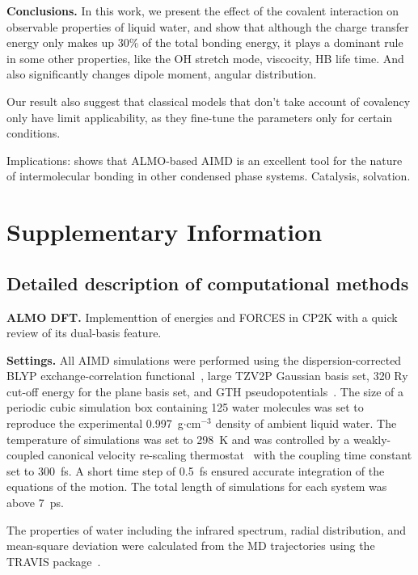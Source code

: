 \documentclass[prl,twocolumn,showpacs]{revtex4}
\begin{document}
\textbf{Conclusions.} In this work, we present the effect of the covalent interaction on observable properties of liquid water, and show that although the charge transfer energy only makes up 30\% of the total bonding energy, it plays a dominant rule in some other properties, like the OH stretch mode, viscocity, HB life time. And also significantly changes dipole moment, angular distribution. 
 
Our result also suggest that classical models that don't take account of covalency only have limit applicability, as they fine-tune the parameters only for certain conditions.
 
Implications: shows that ALMO-based AIMD is an excellent tool for the nature of intermolecular bonding in other condensed phase systems. Catalysis, solvation.

\section{Supplementary Information}

\subsection{Detailed description of computational methods}

\textbf{ALMO DFT.} Implementtion of energies and FORCES in CP2K with a quick review of its dual-basis feature.

\textbf{Settings.} All AIMD simulations were performed using the dispersion-corrected~\cite{grimme2010consistent} BLYP exchange-correlation functional~\cite{becke1988density}, large TZV2P Gaussian basis set, 320 Ry cut-off energy for the plane basis set, and GTH pseudopotentials~\cite{goedecker1996separable,krack2005pseudopotentials}. The size of a periodic cubic simulation box containing 125 water molecules was set to reproduce the experimental 0.997~g$\cdot$cm$^{-3}$ density of ambient liquid water. The temperature of simulations was set to 298~K and was controlled by a weakly-coupled canonical velocity re-scaling thermostat~\cite{bussi2007canonical} with the coupling time constant set to 300~fs. A short time step of 0.5~fs ensured accurate integration of the equations of the motion. The total length of simulations for each system was above 7~ps.

The properties of water including the infrared spectrum, radial distribution, and mean-square deviation were calculated from the MD trajectories using the TRAVIS package~\cite{brehm2012travis}.  
\end{document}
